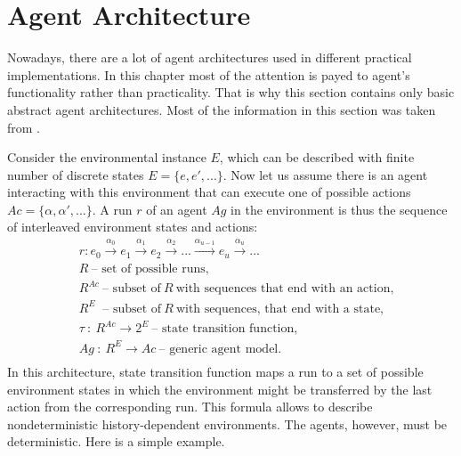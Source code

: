 \section{Agent Architecture}
Nowadays, there are a lot of agent architectures used in different practical implementations. In this chapter most of the attention is payed to agent's functionality rather than practicality.   That is why this section contains only basic abstract agent architectures. Most of the information in this section was taken from \cite{DUMMY:1}.\par
Consider the environmental instance \(E\), which can be described with finite number of discrete states \(E=\{e,e',...\}\). Now let us assume there is an agent interacting with this environment that can execute one of possible actions  \(Ac = \{\alpha , \alpha' , ... \} \).
A run \(r\) of an agent \(Ag\) in the environment is thus the sequence of interleaved environment states and actions:
\begin{align*}
& r: e_0 \xrightarrow{\text{\(\alpha_0\)}}  e_1 \xrightarrow{\text{\(\alpha_1\)}} e_2 \xrightarrow{\text{\(\alpha_2\)}}... \xrightarrow{\text{\(\alpha_{u-1}\)}} e_u \xrightarrow{\text{\(\alpha_{u}\)}} ... \\
&R\ \text{-- set of possible runs,}\\
&R^{Ac}\ \text{-- subset of}\ R\ \text{with sequences that end with an action,}\\
&R^E\ \text{ -- subset of}\ R\ \text{with sequences, that end with a state,}\\
&\tau\ :\ R^{Ac} \rightarrow 2^E\ \text{-- state transition function,}\\
&Ag\ :\ R^E \rightarrow Ac\ \text{-- generic agent model.}\\
\end{align*}
In this architecture, state transition function maps a run to a set of possible environment states in which the environment might be transferred by the last action from the corresponding run. This formula allows to describe nondeterministic history-dependent environments. The agents, however, must be deterministic.
Here is a simple example.
